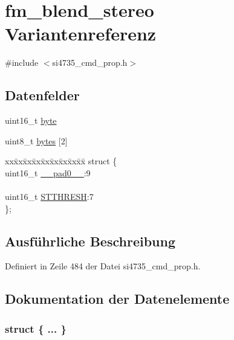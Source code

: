 \hypertarget{unionfm__blend__stereo}{}\section{fm\+\_\+blend\+\_\+stereo Variantenreferenz}
\label{unionfm__blend__stereo}


{\ttfamily \#include $<$si4735\+\_\+cmd\+\_\+prop.\+h$>$}

\subsection*{Datenfelder}
\begin{DoxyCompactItemize}
\item 
uint16\+\_\+t \hyperlink{unionfm__blend__stereo_ab0549c1b5ea980a02e7eab77e21fea49}{byte}
\item 
uint8\+\_\+t \hyperlink{unionfm__blend__stereo_a46e4c05d20a047ec169f60d3167e912e}{bytes} \mbox{[}2\mbox{]}
\item 
\begin{tabbing}
xx\=xx\=xx\=xx\=xx\=xx\=xx\=xx\=xx\=\kill
struct \{\\
\>uint16\_t \hyperlink{unionfm__blend__stereo_a77132c2c26a75f5b8751b235cda23828}{\_\_pad0\_\_}:9\\
\>\\
\>uint16\_t \hyperlink{unionfm__blend__stereo_a657a0ae89d4ea37bac29c56d527e1454}{STTHRESH}:7\\
\}; \\

\end{tabbing}\end{DoxyCompactItemize}


\subsection{Ausführliche Beschreibung}


Definiert in Zeile 484 der Datei si4735\+\_\+cmd\+\_\+prop.\+h.



\subsection{Dokumentation der Datenelemente}
\hypertarget{unionfm__blend__stereo_a8b923945f32f56b811b07b0398fdacf2}{}\subsubsection[{"@51}]{\setlength{\rightskip}{0pt plus 5cm}struct \{ ... \} }\label{unionfm__blend__stereo_a8b923945f32f56b811b07b0398fdacf2}
\hypertarget{unionfm__blend__stereo_a77132c2c26a75f5b8751b235cda23828}{}
